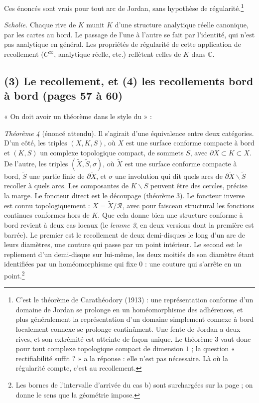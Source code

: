 \documentclass[11pt,a4paper]{article}
\begin{document}
Ces énoncés sont vrais pour tout arc de Jordan, sans hypothèse de
régularité.\footnote{C'est le théorème de Carathéodory (1913) : une
représentation conforme d'un domaine de Jordan se prolonge en un
homéomorphisme des adhérences, et plus généralement la représentation d'un
domaine simplement connexe à bord localement connexe se prolonge
continûment. Une fente de Jordan a deux rives, et son extrémité est atteinte
de façon unique. Le théorème 3 vaut donc pour tout complexe topologique
compact de dimension $1$ ; la question « rectifiabilité suffit ? » a la
réponse : elle n'est pas nécessaire. Là où la régularité compte, c'est au
recollement.}

\emph{Scholie.} Chaque rive de $K$ munit $K$ d'une structure analytique
réelle canonique, par les cartes au bord. Le passage de l'une à l'autre se
fait par l'identité, qui n'est pas analytique en général. Les propriétés de
régularité de cette application de recollement ($C^{\infty}$, analytique
réelle, etc.) reflètent celles de $K$ dans $\mathbb{C}$.

\subsection*{(3) Le recollement, et (4) les recollements bord à bord (pages 57 à 60)}

« On doit avoir un théorème dans le style du » :

\emph{Théorème 4} (énoncé attendu). Il s'agirait d'une équivalence entre deux
catégories. D'un côté, les triples $(X, K, S)$, où $X$ est une surface
conforme compacte à bord et $(K, S)$ un complexe topologique compact, de
sommets $S$, avec $\partial X \subset K \subset X$. De l'autre, les triples
$(\widetilde{X}, \widetilde{S}, \sigma)$, où $\widetilde{X}$ est une surface
conforme compacte à bord, $\widetilde{S}$ une partie finie de $\partial
\widetilde{X}$, et $\sigma$ une involution qui dit quels arcs de $\partial
\widetilde{X} \smallsetminus \widetilde{S}$ recoller à quels arcs. Les
composantes de $K \smallsetminus S$ peuvent être des cercles, précise la
marge. Le foncteur direct est le découpage (théorème 3). Le foncteur inverse
est connu topologiquement : $X = \widetilde{X}/\mathcal{R}$, avec pour
faisceau structural les fonctions continues conformes hors de $K$. Que cela
donne bien une structure conforme à bord revient à deux cas locaux (le
\emph{lemme 3}, en deux versions dont la première est barrée). Le premier
est le recollement de deux demi-disques le long d'un arc de leurs diamètres,
une couture qui passe par un point intérieur. Le second est le repliement
d'un demi-disque sur lui-même, les deux moitiés de son diamètre étant
identifiées par un homéomorphisme qui fixe $0$ : une couture qui s'arrête en
un point.\footnote{Les bornes de l'intervalle d'arrivée du cas b) sont
surchargées sur la page ; on donne le sens que la géométrie impose.}
\end{document}
